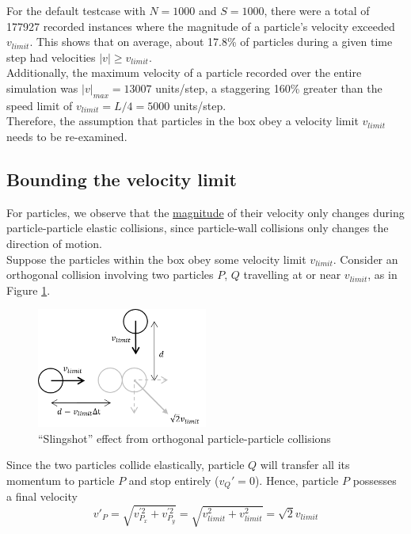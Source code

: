 \documentclass[12pt]{article}
\begin{document}
For the default testcase with $N=1000$ and $S=1000$, there were a total of 177927 recorded instances where the magnitude of a particle’s velocity exceeded $v_{limit}$. This shows that on average, about 17.8\% of particles during a given time step had velocities $\left|v\right| \geq v_{limit}$. \\

Additionally, the maximum velocity of a particle recorded over the entire simulation was $\left|v\right|_{max} = 13007$ units/step, a staggering 160\% greater than the speed limit of $v_{limit} = L/4 = 5000$ units/step. \\

Therefore, the assumption that particles in the box obey a velocity limit $v_{limit}$ needs to be re-examined.

\subsection{Bounding the velocity limit}

For particles, we observe that the \ul{magnitude} of their velocity only changes during particle-particle elastic collisions, since particle-wall collisions only changes the direction of motion. \\

Suppose the particles within the box obey some velocity limit $v_{limit}$. Consider an orthogonal collision involving two particles $P$, $Q$ travelling at or near $v_{limit}$, as in Figure \ref{fig:chap8Slingshot}. \\

\begin{figure}[H]
    \centering
    \includegraphics[width=0.5\textwidth]{./reportAssets/chap8Slingshot}
    \caption{``Slingshot'' effect from orthogonal particle-particle collisions}
    \label{fig:chap8Slingshot}
\end{figure}

Since the two particles collide elastically, particle $Q$ will transfer all its momentum to particle $P$ and stop entirely ($v_Q' = 0$). Hence, particle $P$ possesses a final velocity
$$v'_P = \sqrt{v_{P_x}^{'2} + v_{P_y}^{'2}} = \sqrt{v_{limit}^2 + v_{limit}^2} = \sqrt{2}v_{limit}$$
\end{document}
